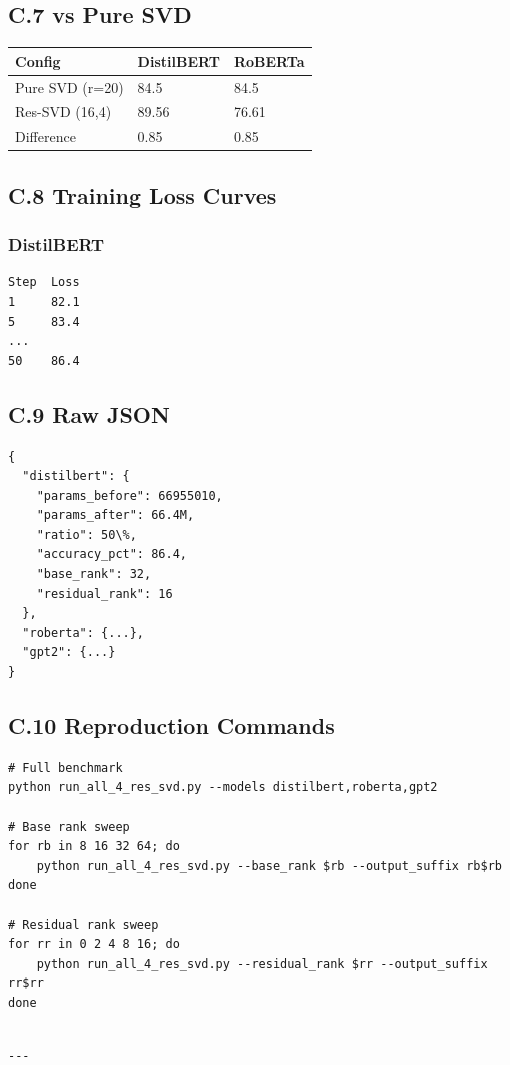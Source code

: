 \subsection{C.7 vs Pure SVD}

\begin{table}[H]
\centering
\small
\begin{tabular}{lll}
\toprule
\textbf{Config} & \textbf{DistilBERT} & \textbf{RoBERTa} \\
\midrule
Pure SVD (r=20) & 84.5 & 84.5 \\
Res-SVD (16,4) & 89.56 & 76.61 \\
Difference & 0.85 & 0.85 \\
\bottomrule
\end{tabular}
\end{table}

\subsection{C.8 Training Loss Curves}

\subsubsection{DistilBERT}
\begin{lstlisting}
Step  Loss
1     82.1
5     83.4
...
50    86.4
\end{lstlisting}

\subsection{C.9 Raw JSON}

\begin{lstlisting}
{
  "distilbert": {
    "params_before": 66955010,
    "params_after": 66.4M,
    "ratio": 50\%,
    "accuracy_pct": 86.4,
    "base_rank": 32,
    "residual_rank": 16
  },
  "roberta": {...},
  "gpt2": {...}
}
\end{lstlisting}

\subsection{C.10 Reproduction Commands}

\begin{lstlisting}
# Full benchmark
python run_all_4_res_svd.py --models distilbert,roberta,gpt2

# Base rank sweep
for rb in 8 16 32 64; do
    python run_all_4_res_svd.py --base_rank $rb --output_suffix rb$rb
done

# Residual rank sweep
for rr in 0 2 4 8 16; do
    python run_all_4_res_svd.py --residual_rank $rr --output_suffix rr$rr
done
\end{lstlisting}
\begin{lstlisting}

---
\end{lstlisting}